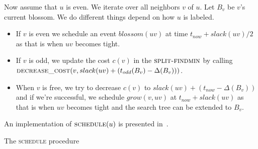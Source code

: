 Now assume that $u$ is even. We iterate over all neighbors $v$ of $u$. Let $B_v$ be $v$'s current blossom. We do different things depend on how $u$ is labeled.
\begin{itemize}
    \item If $v$ is even we schedule an event $blossom(uv)$ at time $t_{now} + slack(uv)/2$ as that is when $uv$ becomes tight.
    \item If $v$ is odd, we update the cost $c(v)$ in the $\textsc{split-findmin}$ by calling $\textsc{decrease\_cost}(v, slack(uv) + (t_{odd}(B_v) - \Delta(B_v)))$.
    \item When $v$ is free, we try to decrease $c(v)$ to $slack(uv) + (t_{now} - \Delta(B_v))$ and if we're successful, we schedule $grow(v, uv)$ at $t_{now} + slack(uv)$ as that is when $uv$ becomes tight and the search tree can be extended to $B_v$.
\end{itemize}

An implementation of $\textsc{schedule}(u)$ is presented in~.

\begin{algorithm}
\caption{The \textsc{schedule} procedure}\label{alg:schedule}
\begin{algorithmic}[1]
        \EndIf
        \Else
        \EndIf
    \Else {}
            \EndIf
            \Else
                \EndIf
            \EndIf
        \EndFor
    \EndIf
\EndProcedure
\end{algorithmic}
\end{algorithm}

